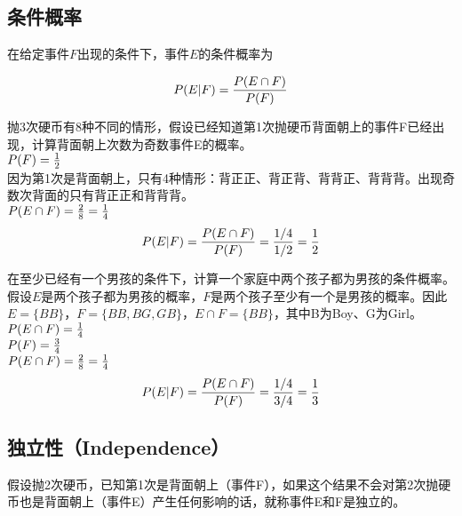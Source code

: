 \subsection{条件概率}

在给定事件$ F $出现的条件下，事件$ E $的条件概率为

\vspace{-1cm}

\begin{align}
	P(E|F) = {P(E \cap F) \over P(F)}
\end{align}

\begin{tcolorbox}
	抛3次硬币有8种不同的情形，假设已经知道第1次抛硬币背面朝上的事件F已经出现，计算背面朝上次数为奇数事件E的概率。\\
	$ P(F) = {1 \over 2} $\\
	因为第1次是背面朝上，只有4种情形：背正正、背正背、背背正、背背背。出现奇数次背面的只有背正正和背背背。\\
	$ P(E \cap F) = {2 \over 8} = {1 \over 4} $
	\begin{align*}
		P(E|F) = {P(E \cap F) \over P(F)} = {1/4 \over 1/2} = {1 \over 2}
	\end{align*}
\end{tcolorbox}

\begin{tcolorbox}
	在至少已经有一个男孩的条件下，计算一个家庭中两个孩子都为男孩的条件概率。\\
	假设$ E $是两个孩子都为男孩的概率，$ F $是两个孩子至少有一个是男孩的概率。因此$ E = \{BB\} $，$ F = \{BB, BG, GB\} $，$ E \cap F = \{BB\} $，其中B为Boy、G为Girl。\\
	$ P(E \cap F) = {1 \over 4} $\\
	$ P(F) = {3 \over 4} $\\
	$ P(E \cap F) = {2 \over 8} = {1 \over 4} $
	\begin{align*}
		P(E|F) = {P(E \cap F) \over P(F)} = {1/4 \over 3/4} = {1 \over 3}
	\end{align*}
\end{tcolorbox}

\vspace{0.5cm}

\subsection{独立性（Independence）}

假设抛2次硬币，已知第1次是背面朝上（事件F），如果这个结果不会对第2次抛硬币也是背面朝上（事件E）产生任何影响的话，就称事件E和F是独立的。\\

